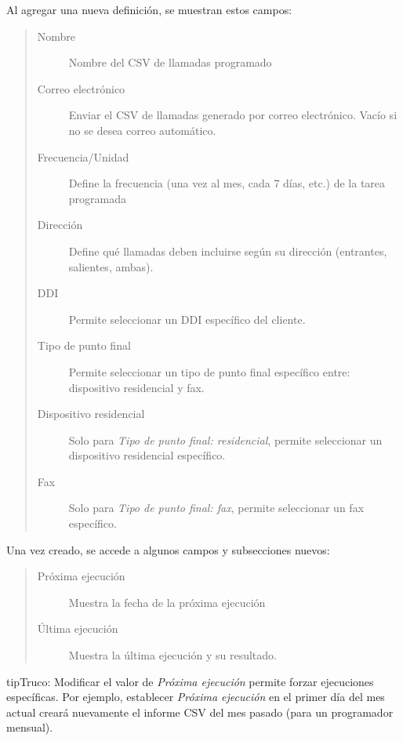 \documentclass[letterpaper,10pt,spanish]{sphinxmanual}
\begin{document}
Al agregar una nueva definición, se muestran estos campos:
\begin{quote}
\begin{description}
\item[{Nombre}] \leavevmode
Nombre del CSV de llamadas programado

\item[{Correo electrónico}] \leavevmode
Enviar el CSV de llamadas generado por correo electrónico. Vacío si no se desea correo automático.

\item[{Frecuencia/Unidad}] \leavevmode
Define la frecuencia (una vez al mes, cada 7 días, etc.) de la tarea programada

\item[{Dirección}] \leavevmode
Define qué llamadas deben incluirse según su dirección (entrantes, salientes, ambas).

\item[{DDI}] \leavevmode
Permite seleccionar un DDI específico del cliente.

\item[{Tipo de punto final}] \leavevmode
Permite seleccionar un tipo de punto final específico entre: dispositivo residencial y fax.

\item[{Dispositivo residencial}] \leavevmode
Solo para \emph{Tipo de punto final: residencial}, permite seleccionar un dispositivo residencial específico.

\item[{Fax}] \leavevmode
Solo para \emph{Tipo de punto final: fax}, permite seleccionar un fax específico.

\end{description}
\end{quote}

Una vez creado, se accede a algunos campos y subsecciones nuevos:
\begin{quote}
\begin{description}
\item[{Próxima ejecución}] \leavevmode
Muestra la fecha de la próxima ejecución

\item[{Última ejecución}] \leavevmode
Muestra la última ejecución y su resultado.

\end{description}
\end{quote}

\begin{notice}{tip}{Truco:}
Modificar el valor de \emph{Próxima ejecución} permite forzar ejecuciones específicas. Por ejemplo, establecer \emph{Próxima ejecución} en el primer día del mes actual creará nuevamente el informe CSV del mes pasado (para un programador mensual).
\end{notice}
\end{document}
